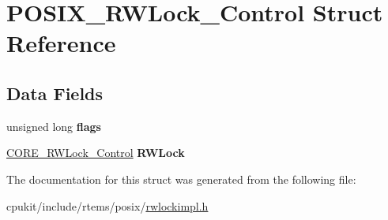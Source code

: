 \hypertarget{structPOSIX__RWLock__Control}{}\section{P\+O\+S\+I\+X\+\_\+\+R\+W\+Lock\+\_\+\+Control Struct Reference}
\label{structPOSIX__RWLock__Control}
\subsection*{Data Fields}
\begin{DoxyCompactItemize}
\item 
\mbox{\label{structPOSIX__RWLock__Control_a8b320d0d9fb18e181353938b4ccdabea}} 
unsigned long {\bfseries flags}
\item 
\mbox{\label{structPOSIX__RWLock__Control_ae9807ea2fcceef1727d46dc1823fc033}} 
\mbox{\hyperlink{structCORE__RWLock__Control}{C\+O\+R\+E\+\_\+\+R\+W\+Lock\+\_\+\+Control}} {\bfseries R\+W\+Lock}
\end{DoxyCompactItemize}


The documentation for this struct was generated from the following file\+:\begin{DoxyCompactItemize}
\item 
cpukit/include/rtems/posix/\mbox{\hyperlink{rwlockimpl_8h}{rwlockimpl.\+h}}\end{DoxyCompactItemize}
